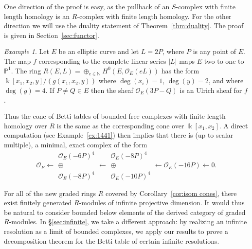 \documentclass[12pt]{amsart}
\theoremstyle{definition}
\theoremstyle{remark}
\newtheorem{example}[lemma]{Example}
\newcommand{\kk}{\Bbbk}
\newcommand{\PP}{\mathbb{P}}
\newcommand{\NN}{\mathbb{N}}
\newcommand{\cO}{\mathcal{O}}
\renewcommand{\P}{{\mathbb P}}
\begin{document}
One direction of the proof is easy, as the pullback of an $S$-complex with finite length homology is an $R$-complex with finite length homology.  For the other direction we will use the duality statement of Theorem~\ref{thm:duality}. The proof is given in Section~\ref{sec:functor}.

\begin{example}\label{ex:elliptic}
Let $E$ be an elliptic curve and let $L=2P$, where $P$ is any point of $E$.  The map $f$ corresponding to the complete
linear series $|L|$ maps $E$ two-to-one to $\P^{1}$. The ring $R(E,L)=\oplus_{e\in \NN} H^0(E,\cO_E(eL))$ has the form
$\kk[x_1,x_2,y]/(g(x_{1},x_{2},y))$  where $\deg(x_i)=1$, $\deg(y)=2$, and where $\deg(g)=4$.
If $P\neq Q\in E$ then the sheaf $\cO_E(3P-Q)$ is an Ulrich sheaf for $f$. 

Thus the cone of
Betti tables of bounded free complexes with finite length homology over $R$ is the same
as the corresponding cone over $\kk[x_1,x_2]$.  A direct computation (see Example~\ref{ex:1441}) then implies that there is (up to scalar multiple), a minimal, exact complex of the form
\[
\cO_E\longleftarrow \begin{matrix}  \cO_E(-6P)^4\\ \oplus\\ \cO_E(-8P)^4\end{matrix}\longleftarrow \begin{matrix}  \cO_E(-8P)^4\\ \oplus\\ \cO_E(-10P)^4\end{matrix} \longleftarrow \cO_E(-16P)\longleftarrow 0.
\]
\end{example}


For all of the new graded rings $R$ covered by Corollary~\ref{cor:isom cones}, there exist finitely generated $R$-modules of infinite projective dimension.  It would thus be natural to consider bounded below elements of the derived category of graded $R$-modules.  In \S\ref{sec:infinite}, we take a different approach: by realizing an infinite resolution as a limit of bounded complexes, we apply our results to prove a decomposition theorem for the Betti table of certain infinite resolutions.
\end{document}
